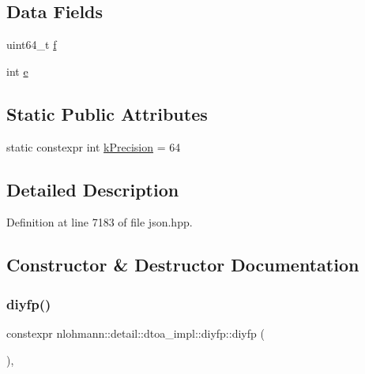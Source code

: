 \subsection*{Data Fields}
\begin{DoxyCompactItemize}
\item 
uint64\+\_\+t \hyperlink{structnlohmann_1_1detail_1_1dtoa__impl_1_1diyfp_a90f04c892ac1e707fdb50b0e1eb59030}{f}
\item 
int \hyperlink{structnlohmann_1_1detail_1_1dtoa__impl_1_1diyfp_ae22e170815983961447c429f324c944d}{e}
\end{DoxyCompactItemize}
\subsection*{Static Public Attributes}
\begin{DoxyCompactItemize}
\item 
static constexpr int \hyperlink{structnlohmann_1_1detail_1_1dtoa__impl_1_1diyfp_a03682754b06ed4f30b263119eecc2d52}{k\+Precision} = 64
\end{DoxyCompactItemize}


\subsection{Detailed Description}


Definition at line 7183 of file json.\+hpp.



\subsection{Constructor \& Destructor Documentation}
\mbox{\label{structnlohmann_1_1detail_1_1dtoa__impl_1_1diyfp_a23d25b3ad4527270a6e3f2a0bcca11e6}} 
\subsubsection{\texorpdfstring{diyfp()}{diyfp()}\hspace{0.1cm}{\footnotesize\ttfamily [1/2]}}
{\footnotesize\ttfamily constexpr nlohmann\+::detail\+::dtoa\+\_\+impl\+::diyfp\+::diyfp (\begin{DoxyParamCaption}{ }\end{DoxyParamCaption})\hspace{0.3cm}{\ttfamily [inline]}, {\ttfamily [noexcept]}}



